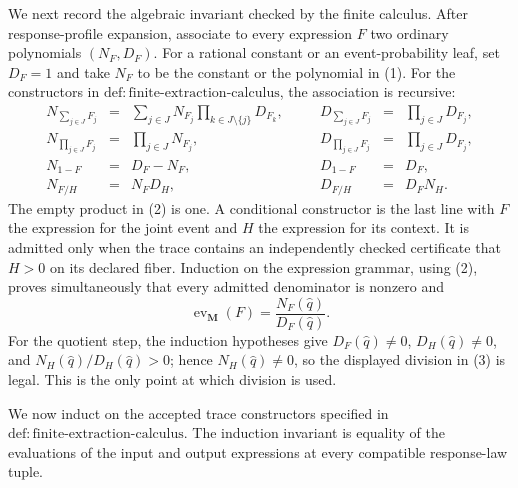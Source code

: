 We next record the algebraic invariant checked by the finite calculus.  After
response-profile expansion, associate to every expression \(F\) two ordinary
polynomials \((N_F,D_F)\).  For a rational constant or an event-probability
leaf, set \(D_F=1\) and take \(N_F\) to be the constant or the polynomial in
(1).  For the constructors in
\(\mathrm{def:finite\text{-}extraction\text{-}calculus}\), the association is
recursive:
\[
\begin{array}{rclcrcl}
 N_{\sum_{j\in J}F_j}
 &=&\displaystyle\sum_{j\in J}N_{F_j}
       \prod_{k\in J\setminus\{j\}}D_{F_k},
 &\quad&
 D_{\sum_{j\in J}F_j}&=&\displaystyle\prod_{j\in J}D_{F_j},\\[4pt]
 N_{\prod_{j\in J}F_j}&=&\displaystyle\prod_{j\in J}N_{F_j},
 &&D_{\prod_{j\in J}F_j}&=&\displaystyle\prod_{j\in J}D_{F_j},\\[4pt]
 N_{1-F}&=&D_F-N_F,
 &&D_{1-F}&=&D_F,\\[4pt]
 N_{F/H}&=&N_FD_H,
 &&D_{F/H}&=&D_FN_H.
\end{array}
\tag{2}
\]
The empty product in (2) is one.  A conditional constructor is the last line
with \(F\) the expression for the joint event and \(H\) the expression for its
context.  It is admitted only when the trace contains an independently checked
certificate that \(H>0\) on its declared fiber.  Induction on the expression
grammar, using (2), proves simultaneously that every admitted denominator is
nonzero and
\[
 \operatorname{ev}_{\mathbf M}(F)
 =\frac{N_F(\widehat q)}{D_F(\widehat q)}.
 \tag{3}
\]
For the quotient step, the induction hypotheses give
\(D_F(\widehat q)\ne0\), \(D_H(\widehat q)\ne0\), and
\(N_H(\widehat q)/D_H(\widehat q)>0\); hence
\(N_H(\widehat q)\ne0\), so the displayed division in (3) is legal.  This is
the only point at which division is used.

We now induct on the accepted trace constructors specified in
\(\mathrm{def:finite\text{-}extraction\text{-}calculus}\).  The induction
invariant is equality of the evaluations of the input and output expressions
at every compatible response-law tuple.

